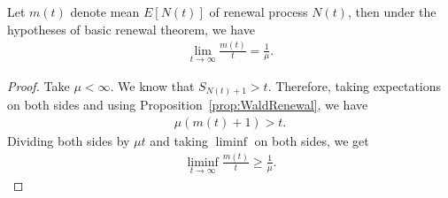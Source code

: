 \documentclass[a4paper,10pt, english]{article}
\begin{document}
\begin{thm} Let $m(t)$ denote mean $E[N(t)]$ of renewal process $N(t)$, then under the hypotheses of basic renewal theorem, we have 
	\begin{align*}
	\lim_{t \to \infty}\frac{m(t)}{t} = \frac{1}{\mu}.
	\end{align*}
\end{thm}
\begin{proof}
	Take $\mu < \infty$. We know that $S_{N(t)+1} > t$. Therefore, taking expectations on both sides and using Proposition~\ref{prop:WaldRenewal}, we have 
	\begin{align*}
	\mu (m(t) + 1) > t.
	\end{align*}
	Dividing both sides by $\mu t$ and taking $\liminf$ on both sides, we get
	\begin{align}
	\label{eq:LiminfMean}
	\liminf_{t \to \infty} \frac{m(t)}{t} \geq \frac{1}{\mu}.
	\end{align}
	

\end{proof}
\end{document}
